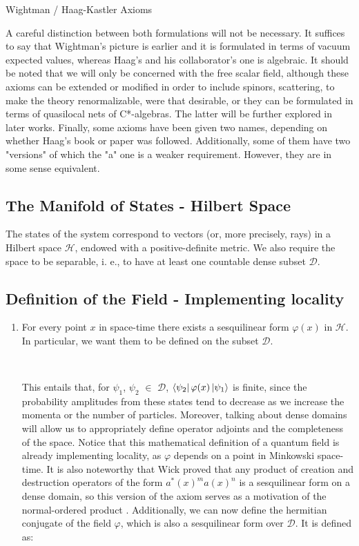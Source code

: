 \documentclass[12pt]{article}
\begin{document}
\begin{section}{Wightman / Haag-Kastler Axioms}

A careful distinction between both formulations will not be necessary. It suffices to say that Wightman's picture is earlier and it is formulated in terms of vacuum expected values, whereas Haag's and his collaborator's one is algebraic. It should be noted that we will only be concerned with the free scalar field, although these axioms can be extended or modified in order to include spinors, scattering, to make the theory renormalizable, were that desirable, or they can be formulated in terms of quasilocal nets of C*-algebras. The latter will be further explored in later works. Finally, some axioms have been given two names, depending on whether Haag's book or paper was followed. Additionally, some of them have two "versions" of which the "a" one is a weaker requirement. However, they are in some sense equivalent.

\subsection{The Manifold of States - Hilbert Space}

The states of the system correspond to vectors (or, more precisely, rays) in a Hilbert space $\mathcal{H}$, endowed with a positive-definite metric. We also require the space to be separable, i. e., to have at least one countable dense subset $\mathcal{D}$.

\subsection{Definition of the Field - Implementing locality}

\begin{enumerate}
\item For every point $x$ in space-time there exists a sesquilinear form $\varphi (x)$ in $\mathcal{H}$. In particular, we want them to be defined on the subset $\mathcal{D}$. 

\

This entails that, for $\psi _1$, $\psi _2$ $\in$ $\mathcal{D}$, $\bra{\psi _2} \varphi (x) \ket{\psi _1}$ is finite, since the probability amplitudes from these states tend to decrease as we increase the momenta or the number of particles. Moreover, talking about dense domains will allow us to appropriately define operator adjoints and the completeness of the space. Notice that this mathematical definition of a quantum field is already implementing locality, as $\varphi$ depends on a point in Minkowski space-time. It is also noteworthy that Wick proved that any product of creation and destruction operators of the form $a^* (x) ^m a(x) ^n$ is a sesquilinear form on a dense domain, so this version of the axiom serves as a motivation of the normal-ordered product \cite{haag_local_1996}. Additionally, we can now define the hermitian conjugate of the field $\varphi$, which is also a sesquilinear form over $\mathcal{D}$. It is defined as:


\end{enumerate}
\end{section}
\end{document}
